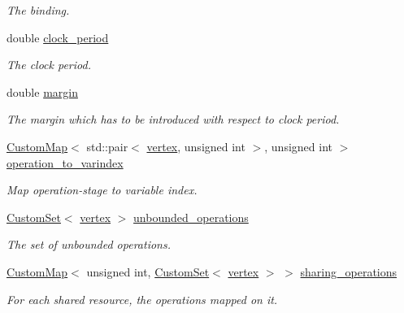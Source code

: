 \begin{DoxyCompactItemize}
\begin{DoxyCompactList}\small\item\em The binding. \end{DoxyCompactList}\item 
double \hyperlink{classSDCScheduling_a3790335edbf15cf7529bf6a8c8d5854b}{clock\+\_\+period}
\begin{DoxyCompactList}\small\item\em The clock period. \end{DoxyCompactList}\item 
double \hyperlink{classSDCScheduling_aee3e9b8bbe23ac358ba87fa4ae58c91a}{margin}
\begin{DoxyCompactList}\small\item\em The margin which has to be introduced with respect to clock period. \end{DoxyCompactList}\item 
\hyperlink{custom__map_8hpp_a18ca01763abbe3e5623223bfe5aaac6b}{Custom\+Map}$<$ std\+::pair$<$ \hyperlink{graph_8hpp_abefdcf0544e601805af44eca032cca14}{vertex}, unsigned int $>$, unsigned int $>$ \hyperlink{classSDCScheduling_a5f9740ba599a1ec7528cbd098de603bf}{operation\+\_\+to\+\_\+varindex}
\begin{DoxyCompactList}\small\item\em Map operation-\/stage to variable index. \end{DoxyCompactList}\item 
\hyperlink{custom__set_8hpp_a615bc2f42fc38a4bb1790d12c759e86f}{Custom\+Set}$<$ \hyperlink{graph_8hpp_abefdcf0544e601805af44eca032cca14}{vertex} $>$ \hyperlink{classSDCScheduling_abd16d929f99a17c322b35db0d6ddfa25}{unbounded\+\_\+operations}
\begin{DoxyCompactList}\small\item\em The set of unbounded operations. \end{DoxyCompactList}\item 
\hyperlink{custom__map_8hpp_a18ca01763abbe3e5623223bfe5aaac6b}{Custom\+Map}$<$ unsigned int, \hyperlink{custom__set_8hpp_a615bc2f42fc38a4bb1790d12c759e86f}{Custom\+Set}$<$ \hyperlink{graph_8hpp_abefdcf0544e601805af44eca032cca14}{vertex} $>$ $>$ \hyperlink{classSDCScheduling_a0a0a1d02753e664c45b75f2473a14e79}{sharing\+\_\+operations}
\begin{DoxyCompactList}\small\item\em For each shared resource, the operations mapped on it. \end{DoxyCompactList}\item 

\end{DoxyCompactItemize}
